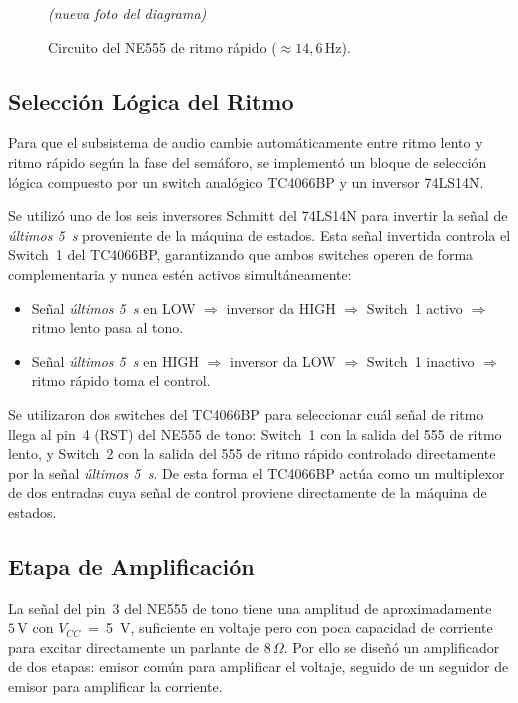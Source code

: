 \documentclass[12pt,onecolumn]{IEEEtran}
\begin{document}
\begin{figure}[H]
    \centering
    \begin{center}\textit{(nueva foto del diagrama)}\end{center}
    \caption{Circuito del NE555 de ritmo rápido ($\approx 14{,}6\,\text{Hz}$).}
    \label{fig:ritmo_rapido}
\end{figure}

\subsection{Selección Lógica del Ritmo}

Para que el subsistema de audio cambie automáticamente entre ritmo lento y ritmo rápido según la fase del semáforo, se implementó un bloque de selección lógica compuesto por un switch analógico TC4066BP y un inversor 74LS14N.

Se utilizó uno de los seis inversores Schmitt del 74LS14N para invertir la señal de \textit{últimos 5~s} proveniente de la máquina de estados. Esta señal invertida controla el Switch~1 del TC4066BP, garantizando que ambos switches operen de forma complementaria y nunca estén activos simultáneamente:

\begin{itemize}
    \item Señal \textit{últimos 5~s} en LOW $\Rightarrow$ inversor da HIGH $\Rightarrow$ Switch~1 activo $\Rightarrow$ ritmo lento pasa al tono.
    \item Señal \textit{últimos 5~s} en HIGH $\Rightarrow$ inversor da LOW $\Rightarrow$ Switch~1 inactivo $\Rightarrow$ ritmo rápido toma el control.
\end{itemize}

Se utilizaron dos switches del TC4066BP para seleccionar cuál señal de ritmo llega al pin~4 (RST) del NE555 de tono: Switch~1 con la salida del 555 de ritmo lento, y Switch~2 con la salida del 555 de ritmo rápido controlado directamente por la señal \textit{últimos 5~s}. De esta forma el TC4066BP actúa como un multiplexor de dos entradas cuya señal de control proviene directamente de la máquina de estados.

\subsection{Etapa de Amplificación}

La señal del pin~3 del NE555 de tono tiene una amplitud de aproximadamente $5\,\text{V}$ con $V_{CC}$~=~\qty{5}{V}, suficiente en voltaje pero con poca capacidad de corriente para excitar directamente un parlante de $8\,\Omega$. Por ello se diseñó un amplificador de dos etapas: emisor común para amplificar el voltaje, seguido de un seguidor de emisor para amplificar la corriente.
\end{document}

